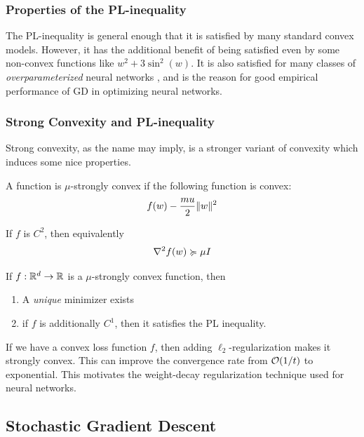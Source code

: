 \subsubsection{Properties of the PL-inequality}
The PL-inequality is general enough that it is satisfied by many standard convex models. However, it has the additional benefit of being satisfied even by some non-convex functions like $w^2 + 3\sin^2(w)$. It is also satisfied for many classes of {\em overparameterized} neural networks \cite{liu2020toward}, and is the reason for good empirical performance of GD in optimizing neural networks.

\subsubsection{Strong Convexity and PL-inequality}
Strong convexity, as the name may imply, is a stronger variant of convexity which induces some nice properties.
\begin{defn}
A function is $\mu$-strongly convex if the following function is convex:
\begin{align*}
    f(w) - \frac{mu}{2}\lVert w \rVert^2
\end{align*}

If $f$ is $C^2$, then equivalently
\begin{align*}
    \nabla^2 f(w) \succcurlyeq \mu I
\end{align*}
\end{defn}
\begin{prop}
If $f: \mathbb{R}^d \to \mathbb{R}$ is a $\mu$-strongly convex function, then
\begin{enumerate}
    \item A {\em unique} minimizer exists
    \item if $f$ is additionally $C^1$, then it satisfies the PL inequality.
\end{enumerate}
\end{prop}
If we have a convex loss function $f$, then adding $\ell_2$-regularization makes it strongly convex. This can improve the convergence rate from $\mathcal{O}(1/t)$ to exponential. This motivates the weight-decay regularization technique used for neural networks.
\subsection{Stochastic Gradient Descent}